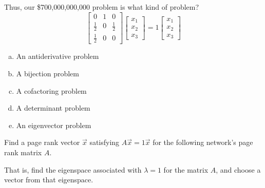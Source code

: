\begin{applicationActivities}
\begin{activity}{5}
Thus, our \$700,000,000,000 problem is what kind of problem?
  \[
    \begin{bmatrix}0&1&0\\\frac{1}{2}&0&\frac{1}{2}\\\frac{1}{2}&0&0\end{bmatrix}
    \begin{bmatrix}x_1\\x_2\\x_3\end{bmatrix}
  =
    1\begin{bmatrix}x_1\\x_2\\x_3\end{bmatrix}
  \]
\begin{enumerate}[(a)]
\item An antiderivative problem
\item A bijection problem
\item A cofactoring problem
\item A determinant problem
\item An eigenvector problem
\end{enumerate}
\end{activity}

\begin{activity}{10}
Find a page rank vector \(\vec{x}\) satisfying \(A\vec{x}=1\vec{x}\)
for the following network's page rank matrix \(A\).

That is, find the eigenspace associated with \(\lambda=1\) for the matrix
\(A\), and choose a vector from that eigenspace.

\begin{multicols}{2}
\begin{center}
\end{center}


\end{multicols}
\end{activity}
\end{applicationActivities}
